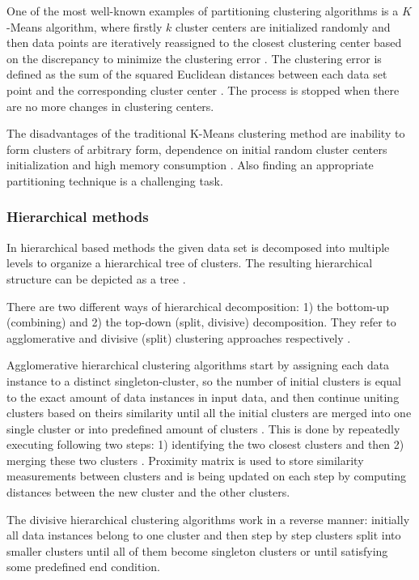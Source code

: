 One of the most well-known examples of partitioning clustering algorithms is a $K$-Means algorithm, where firstly $k$ cluster centers are initialized randomly and then data points are iteratively reassigned to the closest clustering center based on the discrepancy to minimize the clustering error \cite{article:23_survey_ca}. The clustering error is defined as the sum of the squared Euclidean distances between each data set point and the corresponding cluster center \cite{article:24_glkkm_cl_fs}. The process is stopped when there are no more changes in clustering centers.

The disadvantages of the traditional K-Means clustering method are inability to form clusters of arbitrary form, dependence on initial random cluster centers initialization and high memory consumption \cite{article:8_review_mot_cl_alg}. Also finding an appropriate partitioning technique is a challenging task.

\subsubsection{Hierarchical methods}
In hierarchical based methods the given data set is decomposed into multiple levels to organize a hierarchical tree of clusters. The resulting hierarchical structure can be depicted as a tree \cite{article:23_survey_ca}.

There are two different ways of hierarchical decomposition: 1) the bottom-up (combining) and 2) the top-down (split, divisive) decomposition. They refer to agglomerative and divisive (split) clustering approaches respectively \cite{online:what_is_hier_clust}.

Agglomerative hierarchical clustering algorithms start by assigning each data instance to a distinct singleton-cluster, so the number of initial clusters is equal to the exact amount of data instances in input data, and then continue uniting clusters based on theirs similarity until all the initial clusters are merged into one single cluster or into predefined amount of clusters \cite{online:unders_hier_cl}. This is done by repeatedly executing following two steps: 1) identifying the two closest clusters and then 2) merging these two clusters \cite{online:what_is_hier_clust}. Proximity matrix is used to store similarity measurements between clusters and is being updated on each step by computing distances between the new cluster and the other clusters.

The divisive hierarchical clustering algorithms work in a reverse manner: initially all data instances belong to one cluster and then step by step clusters split into smaller clusters until all of them become singleton clusters or until satisfying some predefined end condition.

